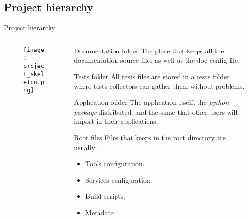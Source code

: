 \subsection{Project hierarchy}
\begin{frame}{Project hierarchy}
    \begin{columns}
        \begin{column}{0.2\textwidth}
            \begin{figure}
                \texttt{[image: project\_skeleton.png]}
            \end{figure}
        \end{column}
        \begin{column}{0.80\textwidth}
            \begin{block}{Documentation folder}
                The place that keeps all the documentation source files as well as the doc config file.
            \end{block}
            \pause
            \begin{block}{Tests folder}
                All tests files are stored in a tests folder where tests collectors can gather them without problems.
            \end{block}
            \pause
            \begin{block}{Application folder}
                The application itself, the \emph{python package} distributed, and the same that other users will import in their applications.
            \end{block}
            \pause
            \begin{block}{Root files}
                Files that keeps in the root directory are usually:
                \begin{itemize}
                    \item Tools configuration.
                    \item Services configuration.
                    \item Build scripts.
                    \item Metadata.
                \end{itemize}
            \end{block}
        \end{column}
    \end{columns}
\end{frame}

